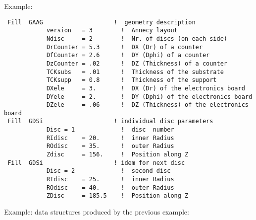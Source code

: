 \vspace{0.5cm}  Example:
\begin{verbatim}
 Fill  GAAG                    !  geometry description
            version   = 3        !  Annecy layout
            Ndisc     = 2        !  Nr. of discs (on each side)
            DrCounter = 5.3      !  DX (Dr) of a counter
            DfCounter = 2.6      !  DY (Dphi) of a counter
            DzCounter = .02      !  DZ (Thickness) of a counter
            TCKsubs   = .01      !  Thickness of the substrate
            TCKsupp   = 0.8      !  Thickness of the support
            DXele     = 3.       !  DX (Dr) of the electronics board
            DYele     = 2.       !  DY (Dphi) of the electronics board
            DZele     = .06      !  DZ (Thickness) of the electronics board
 Fill  GDSi                    ! individual disc parameters
            Disc = 1             !  disc  number
            RIdisc    = 20.      !  inner Radius
            ROdisc    = 35.      !  outer Radius
            Zdisc     = 156.     !  Position along Z
 Fill  GDSi                    ! idem for next disc
            Disc = 2             !  second disc
            RIdisc    = 25.      !  inner Radius
            ROdisc    = 40.      !  outer Radius
            ZDisc     = 185.5    !  Position along Z
\end{verbatim}
 
\vspace{0.3cm} Example: data structures  %
produced by the previous example:
 
\setlength{\unitlength}{1cm}
 
